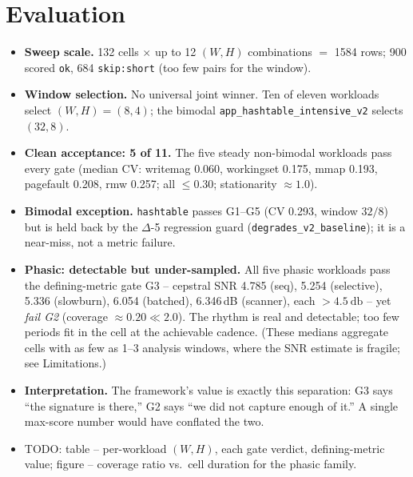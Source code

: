\documentclass[conference]{IEEEtran}
\begin{document}
\section{Evaluation}
\begin{itemize}
  \item \textbf{Sweep scale.} 132 cells $\times$ up to 12 $(W,H)$ combinations
        $=$ 1584 rows; 900 scored \texttt{ok}, 684 \texttt{skip:short}
        (too few pairs for the window).
  \item \textbf{Window selection.} No universal joint winner. Ten of eleven
        workloads select $(W,H)=(8,4)$; the bimodal
        \texttt{app\_hashtable\_intensive\_v2} selects $(32,8)$.
  \item \textbf{Clean acceptance: 5 of 11.} The five steady non-bimodal
        workloads pass every gate (median CV: writemag 0.060, workingset 0.175,
        mmap 0.193, pagefault 0.208, rmw 0.257; all $\le 0.30$; stationarity
        $\approx 1.0$).
  \item \textbf{Bimodal exception.} \texttt{hashtable} passes G1--G5 (CV 0.293,
        window $32/8$) but is held back by the $\Delta$-5 regression guard
        (\texttt{degrades\_v2\_baseline}); it is a near-miss, not a metric
        failure.
  \item \textbf{Phasic: detectable but under-sampled.} All five phasic workloads
        pass the defining-metric gate G3 -- cepstral SNR
        4.785 (seq), 5.254 (selective), 5.336 (slowburn), 6.054 (batched),
        6.346\,dB (scanner), each $>\SI{4.5}{\decibel}$ -- yet \emph{fail G2}
        (coverage $\approx 0.20 \ll 2.0$). The rhythm is real and detectable;
        too few periods fit in the cell at the achievable cadence. (These
        medians aggregate cells with as few as 1--3 analysis windows, where the
        SNR estimate is fragile; see Limitations.)
  \item \textbf{Interpretation.} The framework's value is exactly this
        separation: G3 says ``the signature is there,'' G2 says ``we did not
        capture enough of it.'' A single max-score number would have conflated
        the two.
  \item TODO: table -- per-workload $(W,H)$, each gate verdict, defining-metric
        value; figure -- coverage ratio vs.\ cell duration for the phasic family.
\end{itemize}
\end{document}
